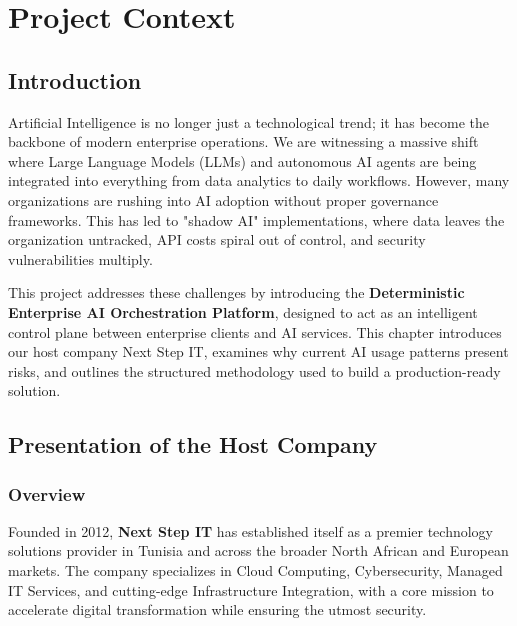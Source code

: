 \chapter{Project Context}

\section*{Introduction}

Artificial Intelligence is no longer just a technological trend; it has become the backbone of modern enterprise operations. We are witnessing a massive shift where Large Language Models (LLMs) and autonomous AI agents are being integrated into everything from data analytics to daily workflows. However, many organizations are rushing into AI adoption without proper governance frameworks. This has led to "shadow AI" implementations, where data leaves the organization untracked, API costs spiral out of control, and security vulnerabilities multiply.

This project addresses these challenges by introducing the \textbf{Deterministic Enterprise AI Orchestration Platform}, designed to act as an intelligent control plane between enterprise clients and AI services. This chapter introduces our host company Next Step IT, examines why current AI usage patterns present risks, and outlines the structured methodology used to build a production-ready solution.

\section{Presentation of the Host Company}

\subsection{Overview}

Founded in 2012, \textbf{Next Step IT} has established itself as a premier technology solutions provider in Tunisia and across the broader North African and European markets. The company specializes in Cloud Computing, Cybersecurity, Managed IT Services, and cutting-edge Infrastructure Integration, with a core mission to accelerate digital transformation while ensuring the utmost security.

